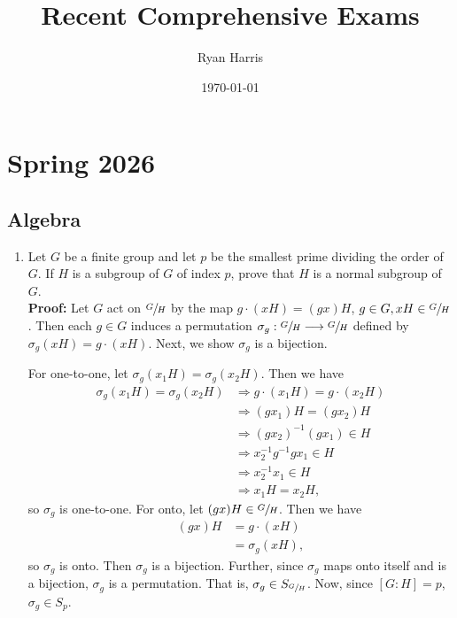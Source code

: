 \documentclass{article}
\title{Recent Comprehensive Exams}
\author{Ryan Harris}
\date{\today}
\begin{document}
\section{Spring 2026}
\subsection{Algebra}

\begin{enumerate}
    \item Let $G$ be a finite group and let $p$ be the smallest prime dividing the order of $G$. If $H$ is a subgroup of $G$ of index $p$, 
    prove that $H$ is a normal subgroup of $G$.\\
    \textbf{Proof:} Let $G$ act on $\sfrac{G}{H}$ by the map $g \cdot (xH) = (gx)H$, $g \in G, xH \in \sfrac{G}{H}$. Then each $g \in G$ 
    induces a permutation $\sigma_g: \sfrac{G}{H} \longrightarrow \sfrac{G}{H}$ defined by $\sigma_g(xH) = g \cdot (xH)$. Next, we show 
    $\sigma_g$ is a bijection. 

    For one-to-one, let $\sigma_g(x_1H) = \sigma_g(x_2H)$. Then we have
    \begin{align*}
        \sigma_g(x_1H) = \sigma_g(x_2H) &\Longrightarrow g \cdot (x_1H) = g \cdot (x_2H) \\
        &\Longrightarrow (gx_1)H = (gx_2)H \\
        &\Longrightarrow (gx_2)^{-1}(gx_1) \in H \\
        &\Longrightarrow x_2^{-1}g^{-1}gx_1 \in H \\
        &\Longrightarrow x_2^{-1}x_1 \in H \\
        &\Longrightarrow x_1H = x_2H,
    \end{align*}
    so $\sigma_g$ is one-to-one. For onto, let $(gx)H \in \sfrac{G}{H}$. Then we have
    \begin{align*}
        (gx)H &= g\cdot (xH) \\
        &= \sigma_g(xH),
    \end{align*}
    so $\sigma_g$ is onto. Then $\sigma_g$ is a bijection. Further, since $\sigma_g$ maps onto itself and is a bijection, $\sigma_g$ is a 
    permutation. That is, $\sigma_g \in S_{\sfrac{G}{H}}$. Now, since $[G:H] = p$, $\sigma_g \in S_p$.


\end{enumerate}
\end{document}
